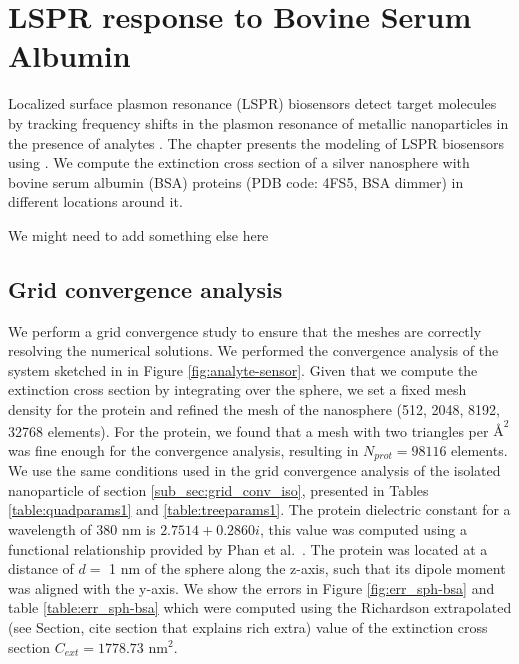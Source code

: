 
\chapter{LSPR response to Bovine Serum Albumin} \label{chap:lspr_response_bsa}
\graphicspath{{lspr_response_bsa/figs/}}

Localized surface plasmon resonance (LSPR) biosensors detect target molecules
by tracking frequency shifts in the plasmon resonance of metallic nanoparticles
in the presence of analytes \cite{WilletsVandyune2007}. The chapter presents the 
modeling of LSPR biosensors using \pygbe. We compute the extinction cross section 
of a silver nanosphere with bovine serum albumin (BSA) proteins (PDB code: 4FS5,
BSA dimmer) in different locations around it. 


{\color{red}
We might need to add something else here
}

\section{Grid convergence analysis} \label{sec:grid_conv_bsa}
We perform a grid convergence study to ensure that the meshes are correctly
resolving the numerical solutions. We performed the convergence analysis of
the system sketched in in Figure \ref{fig:analyte-sensor}. Given that we 
compute the extinction cross section by integrating over the sphere, we set 
a fixed mesh density for the protein and refined the mesh of the nanosphere 
(512, 2048, 8192, 32768 elements). For the protein, we found that a mesh with
two triangles per $\text{\AA}^2$ was fine enough for the convergence 
analysis, resulting in $N_{prot} = 98116$ elements.
We use the same conditions used in the grid convergence analysis of the 
isolated nanoparticle of section \ref{sub_sec:grid_conv_iso}, presented
in Tables \ref{table:quadparams1} and \ref{table:treeparams1}. The protein 
dielectric constant for a wavelength of 380 nm is $2.7514 + 0.2860i$, this  
value was computed using a functional relationship provided by Phan
 et al.~\cite{PhanETal2013}. The protein was located at a distance of 
 $d=$ 1 nm of the sphere along the z-axis, such that its dipole moment 
 was aligned with the y-axis. We show the errors in Figure  \ref{fig:err_sph-bsa} 
 and table \ref{table:err_sph-bsa} which were computed using the Richardson extrapolated
{\color{red} (see Section, cite section that explains rich extra)} value of 
the extinction cross section $C_{ext}= 1778.73$ nm$^2$.

